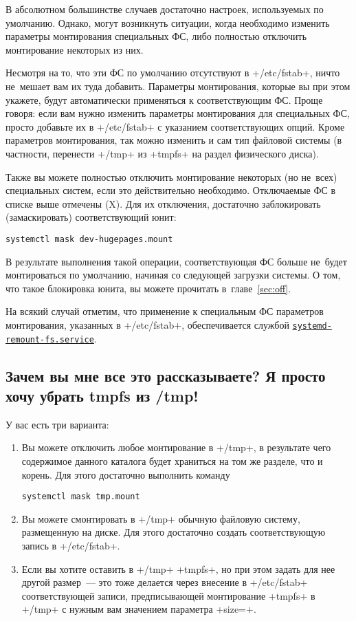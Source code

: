 \documentclass[10pt,oneside,a4paper]{article}
\newcommand{\hreftt}[2]{\href{#1}{\texttt{#2}}}
\begin{document}
В абсолютном большинстве случаев достаточно настроек, используемых по умолчанию.
Однако, могут возникнуть ситуации, когда необходимо изменить параметры
монтирования специальных ФС, либо полностью отключить монтирование некоторых из
них.

Несмотря на то, что эти ФС по умолчанию отсутствуют в +/etc/fstab+, ничто
не~мешает вам их туда добавить. Параметры монтирования, которые вы при этом
укажете, будут автоматически применяться к соответствующим ФС. Проще говоря:
если вам нужно изменить параметры монтирования для специальных ФС, просто
добавьте их в +/etc/fstab+ с указанием соответствующих опций. Кроме параметров
монтирования, так можно изменить и сам тип файловой системы (в частности,
перенести +/tmp+ из +tmpfs+ на раздел физического диска).

Также вы можете полностью отключить монтирование некоторых (но не~всех)
специальных систем, если это действительно необходимо. Отключаемые ФС в списке
выше отмечены (X). Для их отключения, достаточно заблокировать (замаскировать)
соответствующий юнит:
\begin{Verbatim}
systemctl mask dev-hugepages.mount
\end{Verbatim}

В результате выполнения такой операции, соответствующая ФС больше не~будет
монтироваться по умолчанию, начиная со следующей загрузки системы. О том, что
такое блокировка юнита, вы можете прочитать в~главе~\ref{sec:off}.

На всякий случай отметим, что применение к специальным ФС параметров монтирования,
указанных в +/etc/fstab+, обеспечивается службой
\hreftt{http://www.freedesktop.org/software/systemd/man/systemd-remount-fs.service.html}%
{systemd-remount-fs.service}.

\subsection*{Зачем вы мне все это рассказываете? Я просто хочу убрать tmpfs из
/tmp!}

У вас есть три варианта:
\begin{enumerate}
	\item Вы можете отключить любое монтирование в +/tmp+, в результате чего
		содержимое данного каталога будет храниться на том же разделе, что
		и корень. Для этого достаточно выполнить команду
\begin{Verbatim}
systemctl mask tmp.mount
\end{Verbatim}
	\item Вы можете смонтировать в +/tmp+ обычную файловую систему,
		размещенную на диске. Для этого достаточно создать
		соответствующую запись в +/etc/fstab+.
	\item Если вы хотите оставить в +/tmp+ +tmpfs+, но при этом задать для
		нее другой размер~--- это тоже делается через внесение в
		+/etc/fstab+ соответствующей записи, предписывающей монтирование
		+tmpfs+ в +/tmp+ с нужным вам значением параметра +size=+.
\end{enumerate}
\end{document}
